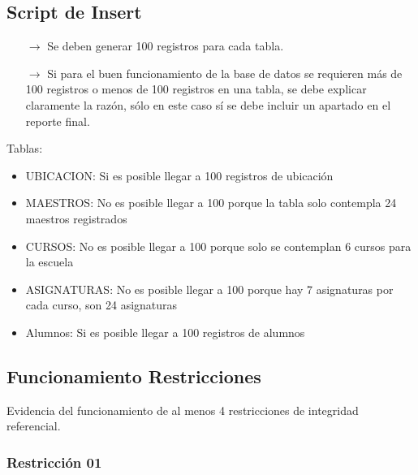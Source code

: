 \subsection{Script de Insert}
\begin{itemize}
    \item[$\rightarrow$] Se deben generar 100 registros para cada tabla.
    \item[$\rightarrow$] Si para el buen funcionamiento de la base de datos se requieren más de 100 registros o
            menos de 100 registros en una tabla, se debe explicar claramente la razón, sólo en este caso
            sí se debe incluir un apartado en el reporte final.
\end{itemize}

Tablas:
\begin{itemize}
  \item UBICACION: Si es posible llegar a 100 registros de ubicación 
  \item MAESTROS: No es posible llegar a 100 porque la tabla solo contempla 24 maestros registrados
  \item CURSOS: No es posible llegar a 100 porque solo se contemplan 6 cursos para la escuela
  \item ASIGNATURAS: No es posible llegar a 100 porque hay 7 asignaturas por cada curso, son 24 asignaturas
  \item Alumnos: Si es posible llegar a 100 registros de alumnos
\end{itemize}

\subsection{Funcionamiento Restricciones}

Evidencia del funcionamiento de al menos 4 restricciones de integridad referencial.

\subsubsection*{Restricción 01}


